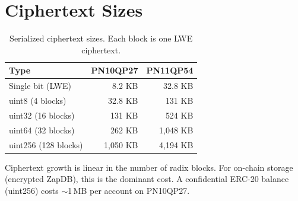 \section{Ciphertext Sizes}


\begin{table}[h]
\centering
\begin{tabular}{@{}lrr@{}}
\toprule
\textbf{Type} & \textbf{PN10QP27} & \textbf{PN11QP54} \\
\midrule
Single bit (LWE) & 8.2 KB & 32.8 KB \\
uint8 (4 blocks) & 32.8 KB & 131 KB \\
uint32 (16 blocks) & 131 KB & 524 KB \\
uint64 (32 blocks) & 262 KB & 1,048 KB \\
uint256 (128 blocks) & 1,050 KB & 4,194 KB \\
\bottomrule
\end{tabular}
\caption{Serialized ciphertext sizes. Each block is one LWE ciphertext.}
\label{tab:ct-sizes}
\end{table}

Ciphertext growth is linear in the number of radix blocks. For on-chain storage (encrypted ZapDB), this is the dominant cost. A confidential ERC-20 balance (uint256) costs $\sim$1\,MB per account on PN10QP27.

